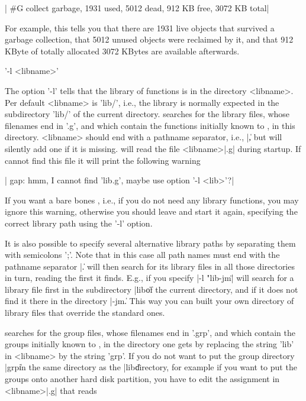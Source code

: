 |    #G collect garbage, 1931 used, 5012 dead, 912 KB free, 3072 KB total|

For example, this tells you that there are 1931 live objects that survived
a garbage collection, that 5012 unused objects  were reclaimed by it, and
that 912 KByte of totally allocated 3072 KBytes are available afterwards.

'-l <libname>'

The option '-l' tells {\GAP}  that the library  of {\GAP} functions is in
the  directory <libname>.  Per  default  <libname> is  'lib/', i.e.,  the
library  is normally expected in the subdirectory  'lib/'  of the current
directory.  {\GAP} searches for the library files, whose filenames end in
'.g', and which contain the functions initially known to  {\GAP}, in this
directory.   <libname> should end  with a  pathname separator, i.e., |\|,
but {\GAP} will silently add one  if it is missing.  {\GAP} will read the
file <libname>|\init.g| during startup.  If {\GAP} cannot find this  file
it will print the following warning

|    gap: hmm, I cannot find 'lib\init.g', maybe use option '-l <lib>'?|

If you  want a bare bones {\GAP},  i.e., if you do  not  need any library
functions, you may ignore this warning, otherwise you should leave {\GAP}
and start  it again, specifying the correct  library path  using the '-l'
option.

It is  also possible to  specify several  alternative library  paths  by
separating them  with semicolons ';'.   Note that in  this  case all path
names must end with the pathname separator  |\|.  {\GAP} will then search
for its library files in all those directories in turn, reading the first
it finds.  E.g., if  you specify |-l "lib\;\usr\local\lib{}-jm\lib\"|
{\GAP} will search for a library file first in the subdirectory |lib\| of
the current directory, and if it does not find it  there in the directory
|\usr\local\lib{}-jm\lib\|. This way you can built your own directory
of {\GAP} library files that override the standard ones.

{\GAP}  searches for the group files,  whose filenames end in '.grp', and
which contain the groups initially known to  {\GAP}, in the directory one
gets by replacing the string 'lib' in <libname> by the  string 'grp'.  If
you do not want  to put the group  directory |grp\| in the same directory
as the |lib\| directory,  for example if you want  to put the groups onto
another   hard  disk  partition,  you have  to   edit the   assignment in
<libname>|\init.g| that reads

